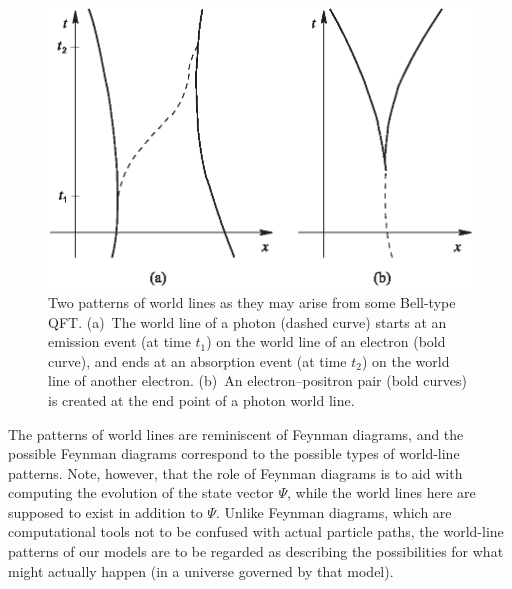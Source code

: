 \documentclass[prl, twocolumn, showpacs, superscriptaddress]{revtex4}%
\begin{document}
\begin{figure}[h]
\begin{center}
\includegraphics[width=\linewidth]{crletf1neu.eps}
\end{center}
\caption{Two patterns of world lines as they may arise from some
   Bell-type QFT. (a)~The world line of a photon (dashed curve) starts
   at an emission event (at time $t_1$) on the world line of an
   electron (bold curve), and ends at an absorption event (at time
   $t_2$) on the world line of another electron. (b)~An
   electron--positron pair (bold curves) is created at the end point of
   a photon world line.}
\label{figone}
\end{figure}

The patterns of world lines are reminiscent of Feynman diagrams, and
the possible Feynman diagrams correspond to the possible types of
world-line patterns.  Note, however, that the role of Feynman diagrams
is to aid with computing the evolution of the state vector $\Psi$,
while the world lines here are supposed to exist in addition to
$\Psi$.  Unlike Feynman diagrams, which are computational tools not to
be confused with actual particle paths, the world-line patterns of our
models are to be regarded as describing the possibilities for what
might actually happen (in a universe governed by that model).
\end{document}
